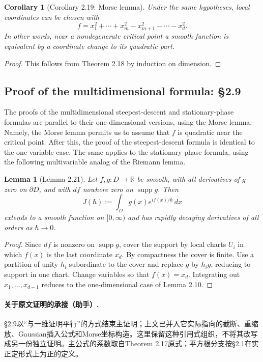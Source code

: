 \documentclass[UTF8,11pt,a4paper]{ctexart}
\newtheorem*{lemma}{Lemma}
\newtheorem*{corollary}{Corollary}
\theoremstyle{definition}\newtheorem*{definition}{Definition}
\theoremstyle{remark}\newtheorem*{remark}{Remark}
\newcommand{\R}{\mathbb R}
\begin{document}
\begin{corollary}[Corollary 2.19: Morse lemma]
Under the same hypotheses, local coordinates can be chosen with
\[
f=x_1^2+\cdots+x_m^2-x_{m+1}^2-\cdots-x_d^2.
\]
In other words, near a nondegenerate critical point a smooth function is equivalent by a coordinate change to its quadratic part.
\end{corollary}
\begin{proof}
This follows from Theorem 2.18 by induction on dimension.
\end{proof}

\subsection*{Proof of the multidimensional formula: §2.9}
The proofs of the multidimensional steepest-descent and stationary-phase formulas are parallel to their one-dimensional versions, using the Morse lemma. Namely, the Morse lemma permits us to assume that $f$ is quadratic near the critical point. After this, the proof of the steepest-descent formula is identical to the one-variable case. The same applies to the stationary-phase formula, using the following multivariable analog of the Riemann lemma.

\begin{lemma}[Lemma 2.21]
Let $f,g:D\to\R$ be smooth, with all derivatives of $g$ zero on $\partial D$, and with $df$ nowhere zero on $\operatorname{supp}g$. Then
\[
J(\hbar):=\int_D g(x)e^{if(x)/\hbar}\,dx
\]
extends to a smooth function on $[0,\infty)$ and has rapidly decaying derivatives of all orders as $\hbar\to0$.
\end{lemma}
\begin{proof}
Since $df$ is nonzero on $\operatorname{supp}g$, cover the support by local charts $U_i$ in which $f(x)$ is the last coordinate $x_d$. By compactness the cover is finite. Use a partition of unity $h_i$ subordinate to the cover and replace $g$ by $h_i g$, reducing to support in one chart. Change variables so that $f(x)=x_d$. Integrating out $x_1,\ldots,x_{d-1}$ reduces to the one-dimensional case of Lemma 2.10.
\end{proof}

\paragraph{关于原文证明的承接（助手）.}
§2.9以“与一维证明平行”的方式结束主证明；上文已并入它实际指向的截断、重缩放、Gaussian插入公式和Morse坐标构造。这里保留这种引用式组织，不将其改写成另一份独立证明。主公式的系数取自Theorem 2.17原式；平方根分支按§2.1在实正定形式上为正的定义。
\end{document}
